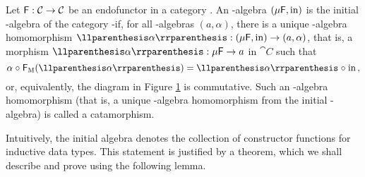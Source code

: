 \begin{definition}
  \label{def:initial-algebra}


  Let $\mathsf{F}: \mathcal{C} \to \mathcal{C}$ be an endofunctor in a category
  . An -algebra $(\mu\mathsf{F},\operatorname{in})$ is the initial
  -algebra of the category -\alg if, for all
  -algebras $(a,\alpha)$, there is a unique -algebra
  homomorphism $\cata\alpha: (\mu\func{F},\inmo) \to (a,\alpha)$, that
  is, a morphism $\cata\alpha: \mu\func{F} \to a$ in $\cat{C}$ such
  that
  \begin{equation}
    \label{eq:cata-charn}
    \alpha \comp \funcM{F}(\cata\alpha) = \cata\alpha \comp \inmo
    \text{,}
  \end{equation}
  or, equivalently, the diagram in Figure \ref{fig:cata-charn} is
  commutative. Such an -algebra homomorphism (that is, a
  unique -algebra homomorphism from the initial
  -algebra) is called a catamorphism.

  \begin{figure}[htb]
    \begin{center}
    \end{center}
    \caption{}
    \label{fig:cata-charn}
  \end{figure}

\end{definition}

Intuitively, the initial algebra denotes the collection of constructor
functions for inductive data types. This statement is justified by a
theorem, which we shall describe and prove using the following lemma.

